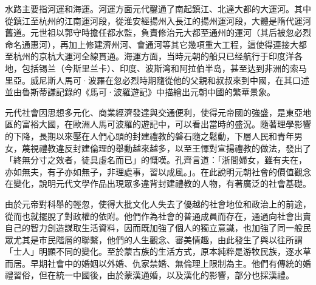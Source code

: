 水路主要指河運和海運。河運方面元代鑿通了南起鎮江、北達大都的大運河。其中從鎮江至杭州的江南運河段，從淮安經揚州入長江的揚州運河段，大體是隋代運河舊道。元世祖以郭守時擔任都水監，負責修治元大都至通州的運河（其后被忽必烈命名通惠河），再加上修建濟州河、會通河等其它幾項重大工程，這使得連接大都至杭州的京杭大運河全線貫通。海運方面，当時元朝的船只已经航行于印度洋各地，包括锡兰（今斯里兰卡）、印度、波斯湾和阿拉伯半岛，甚至达到非洲的索马里亞。威尼斯人馬可·波羅在忽必烈時期隨從他的父親和叔叔來到中國，在其口述並由魯斯蒂謙記錄的《馬可·波羅遊記》中描繪出元朝中國的繁華景象。

元代社會因思想多元化、商業經濟發達與交通便利，使得元帝國的強盛，是東亞地區的富裕大國，在歐洲人馬可波羅的遊記中，可以看出當時的盛況。隨著理學影響的下降，長期以來壓在人們心頭的封建禮教的磐石隨之鬆動，下層人民和青年男女，蔑視禮教違反封建倫理的舉動越來越多，以至王惲對宣揚禮教的做法，發出了「終無分寸之效者，徒具虛名而已」的慨嘆。孔齊言道：「浙間婦女，雖有夫在，亦如無夫，有子亦如無子，非理處事，習以成風。」。在此說明元朝社會的價值觀念在變化，說明元代文學作品出現眾多違背封建禮教的人物，有著廣泛的社會基礎。

由於元帝對科舉的輕忽，使得大批文化人失去了優越的社會地位和政治上的前途，從而也就擺脫了對政權的依附。他們作為社會的普通成員而存在，通過向社會出賣自己的智力創造謀取生活資料，因而既加強了個人的獨立意識，也加強了同一般民眾尤其是市民階層的聯繫，他們的人生觀念、審美情趣，由此發生了與以往所謂「士人」明顯不同的變化。至於蒙古族的生活方式，原本純粹是游牧民族，逐水草而居。早期社會中的婚姻以外婚、仇家禁婚、無倫理上限制為主。他們有傳統的婚禮習俗，但在統一中國後，由於蒙漢通婚，以及漢化的影響，部分也採漢禮。


















